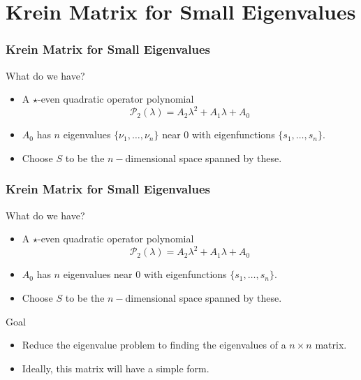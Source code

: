 \documentclass[16pt]{beamer}
\newcommand{\calP}{\mathcal{P}}
\begin{document}
\section{Krein Matrix for Small Eigenvalues}

\begin{frame}
\frametitle{Krein Matrix for Small Eigenvalues}
	What do we have? 
	\begin{itemize}	
	\item A $\star$-even quadratic operator polynomial
	\[ \calP_2(\lambda) = A_2 \lambda^2 + A_1 \lambda + A_0 \]
	\item $A_0$ has $n$ eigenvalues $\{ \nu_1, \dots, \nu_n \}$ near 0 with eigenfunctions $\{s_1, \dots, s_n \}$.
	\item Choose $S$ to be the $n-$dimensional space spanned by these.
	\end{itemize}
\end{frame}

\begin{frame}
\frametitle{Krein Matrix for Small Eigenvalues}
	What do we have? 
	\begin{itemize}	
	\item A $\star$-even quadratic operator polynomial
	\[ \calP_2(\lambda) = A_2 \lambda^2 + A_1 \lambda + A_0 \]
	\item $A_0$ has $n$ eigenvalues near 0 with eigenfunctions $\{s_1, \dots, s_n \}$.
	\item Choose $S$ to be the $n-$dimensional space spanned by these.
	\end{itemize}

	\begin{block}{Goal}
	\begin{itemize}
	\item<1->Reduce the eigenvalue problem to finding the eigenvalues of a $n \times n$ matrix.
	\item<2->Ideally, this matrix will have a simple form. 
	\end{itemize}
	\end{block}
\end{frame}
\end{document}
